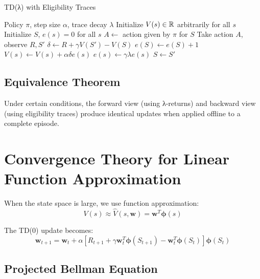 \begin{algorithm}
\caption{TD(λ) with Eligibility Traces}
\begin{algorithmic}
\REQUIRE Policy $\pi$, step size $\alpha$, trace decay $\lambda$
\STATE Initialize $V(s) \in \mathbb{R}$ arbitrarily for all $s$
\REPEAT
    \STATE Initialize $S$, $e(s) = 0$ for all $s$
    \REPEAT
        \STATE $A \leftarrow$ action given by $\pi$ for $S$
        \STATE Take action $A$, observe $R, S'$
        \STATE $\delta \leftarrow R + \gamma V(S') - V(S)$
        \STATE $e(S) \leftarrow e(S) + 1$
            \STATE $V(s) \leftarrow V(s) + \alpha \delta e(s)$
            \STATE $e(s) \leftarrow \gamma \lambda e(s)$
        \ENDFOR
        \STATE $S \leftarrow S'$
\end{algorithmic}
\end{algorithm}

\subsection{Equivalence Theorem}

\begin{theorem}
Under certain conditions, the forward view (using λ-returns) and backward view (using eligibility traces) produce identical updates when applied offline to a complete episode.
\end{theorem}

\section{Convergence Theory for Linear Function Approximation}

When the state space is large, we use function approximation:
\begin{equation}
V(s) \approx \hat{V}(s, \mathbf{w}) = \mathbf{w}^T \boldsymbol{\phi}(s)
\end{equation}

The TD(0) update becomes:
\begin{equation}
\mathbf{w}_{t+1} = \mathbf{w}_t + \alpha[R_{t+1} + \gamma \mathbf{w}_t^T \boldsymbol{\phi}(S_{t+1}) - \mathbf{w}_t^T \boldsymbol{\phi}(S_t)]\boldsymbol{\phi}(S_t)
\end{equation}

\subsection{Projected Bellman Equation}

